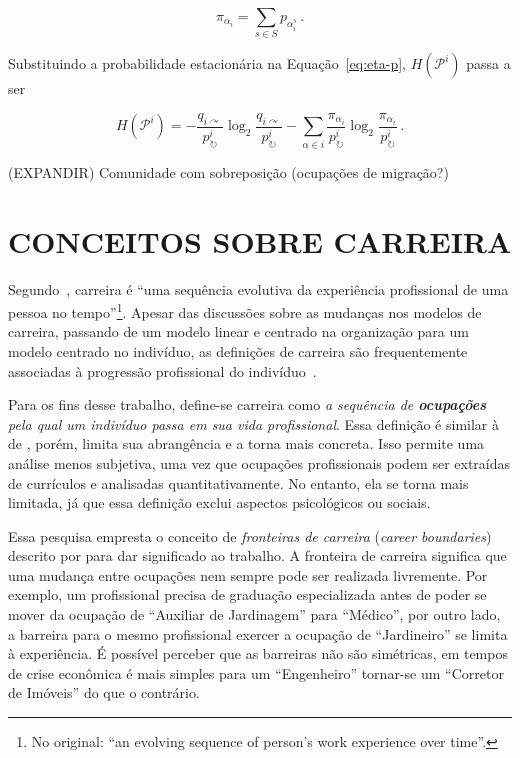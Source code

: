 \documentclass[12pt,a4paper]{article}
\begin{document}
\begin{equation*} \label{eq:page-rank-multilayer}
\pi_{\alpha_i} = \sum_{s \in S} p_{\alpha_i^s}\,.
\end{equation*}

Substituindo a probabilidade estacionária na Equação~\ref{eq:eta-p}, $H(\mathcal{P}^i)$ passa a ser

\begin{equation*}
H(\mathcal{P}^i) = - \frac{q_{i \curvearrowright}}{p^i_\circlearrowright} \log_2 \frac{q_{i \curvearrowright}}{p^i_\circlearrowright} 
-  \sum_{\alpha \in i} \frac{\pi_{\alpha_i}}{p^i_\circlearrowright} \log_2  \frac{\pi_{\alpha_i}}{p^i_\circlearrowright}\,.
\end{equation*}


(EXPANDIR) Comunidade com sobreposição (ocupações de migração?)

\section{CONCEITOS SOBRE CARREIRA} \label{sec:conceitos-sobre-carreiras}

Segundo~, carreira é \foreignquote{english}{uma sequência evolutiva da experiência profissional de uma pessoa no tempo}\footnote{No original: \enquote{an evolving sequence of person's work experience over time}.}. Apesar das discussões sobre as mudanças nos modelos de carreira, passando de um modelo linear e centrado na organização para um modelo centrado no indivíduo, as definições de carreira são frequentemente associadas à progressão profissional do indivíduo~\cite{Baruch2004-oy,Sullivan2009-xb,Bendassolli2009-bg}.

Para os fins desse trabalho, define-se carreira como \textit{a sequência de \textbf{ocupações} pela qual um indivíduo passa em sua vida profissional}. Essa definição é similar à de , porém, limita sua abrangência e a torna mais concreta. Isso permite uma análise menos subjetiva, uma vez que ocupações profissionais podem ser extraídas de currículos e analisadas quantitativamente. No entanto, ela se torna mais limitada, já que essa definição exclui aspectos psicológicos ou sociais.

Essa pesquisa empresta o conceito de \textit{fronteiras de carreira} (\textit{career boundaries}) descrito por  para dar significado ao trabalho. A fronteira de carreira significa que uma mudança entre ocupações nem sempre pode ser realizada livremente. Por exemplo, um profissional precisa de graduação especializada antes de poder se mover da ocupação de \enquote{Auxiliar de Jardinagem} para \enquote{Médico}, por outro lado, a barreira para o mesmo profissional exercer a ocupação de \enquote{Jardineiro} se limita à experiência. É possível perceber que as barreiras não são simétricas, em tempos de crise econômica é mais simples para um \enquote{Engenheiro} tornar-se um \enquote{Corretor de Imóveis} do que o contrário.
\end{document}

